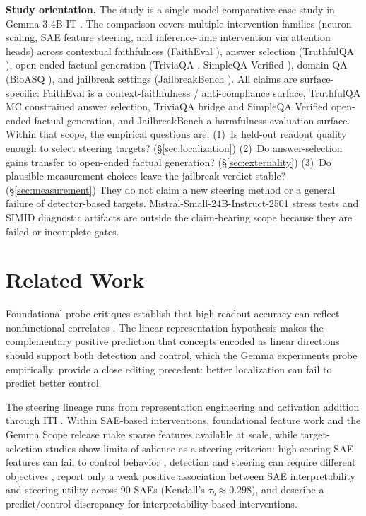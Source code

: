 \documentclass{article}
\begin{document}
\textbf{Study orientation.}
The study is a single-model comparative case study in Gemma-3-4B-IT \citep{gemma2025}.
The comparison covers multiple intervention families (neuron scaling, SAE feature steering, and inference-time intervention via attention heads) across contextual faithfulness (FaithEval \citep{ming2025faitheval}), answer selection (TruthfulQA \citep{lin2022truthfulqa}), open-ended factual generation (TriviaQA \citep{joshi2017triviaqa}, SimpleQA Verified \citep{haas2025simpleqaverified}), domain QA (BioASQ \citep{tsatsaronis2015bioasq}), and jailbreak settings (JailbreakBench \citep{chao2024jailbreakbench}).
All claims are surface-specific: FaithEval is a context-faithfulness / anti-compliance surface, TruthfulQA MC constrained answer selection, TriviaQA bridge and SimpleQA Verified open-ended factual generation, and JailbreakBench a harmfulness-evaluation surface.
Within that scope, the empirical questions are:
(1)~Is held-out readout quality enough to select steering targets? (\S\ref{sec:localization})
(2)~Do answer-selection gains transfer to open-ended factual generation? (\S\ref{sec:externality})
(3)~Do plausible measurement choices leave the jailbreak verdict stable? (\S\ref{sec:measurement})
They do not claim a new steering method or a general failure of detector-based targets.
Mistral-Small-24B-Instruct-2501 stress tests and SIMID diagnostic artifacts are outside the claim-bearing scope because they are failed or incomplete gates.

\section{Related Work}
\label{sec:related}

Foundational probe critiques establish that high readout accuracy can reflect nonfunctional correlates \citep{hewitt2019control,elazar2021amnesic,kumar2022probes}. The linear representation hypothesis \citep{park2024linear} makes the complementary positive prediction that concepts encoded as linear directions should support both detection and control, which the Gemma experiments probe empirically. \citet{hase2023localization} provide a close editing precedent: better localization can fail to predict better control.

The steering lineage runs from representation engineering and activation addition \citep{zou2023repe,turner2024steering} through ITI \citep{li2023iti}. Within SAE-based interventions, foundational feature work \citep{cunningham2023saes} and the Gemma Scope release \citep{lieberum2024gemmascope} make sparse features available at scale, while target-selection studies show limits of salience as a steering criterion: high-scoring SAE features can fail to control behavior \citep{arad2025saes}, detection and steering can require different objectives \citep{wu2025axbench}, \citet{wang2026interpretability} report only a weak positive association between SAE interpretability and steering utility across 90 SAEs (Kendall's $\tau_b \approx 0.298$), and \citet{bhalla2024unifying} describe a predict/control discrepancy for interpretability-based interventions.
\end{document}
